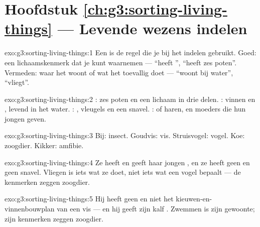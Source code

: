 \section*{Hoofdstuk \ref{ch:g3:sorting-living-things} --- Levende wezens indelen}

\begin{solution}{exo:g3:sorting-living-things:1}
Een  is de regel die je bij het indelen gebruikt. Goed: een
lichaamskenmerk dat je kunt waarnemen --- ``heeft '', ``heeft zes
poten''. Vermeden: waar het woont of wat het toevallig doet --- ``woont
bij water'', ``vliegt''.
\end{solution}

\begin{solution}{exo:g3:sorting-living-things:2}
: zes poten en een lichaam in drie delen. : vinnen en
, levend in het water. : , vleugels en een snavel.
:  of haren, en moeders die hun jongen  geven.
\end{solution}

\begin{solution}{exo:g3:sorting-living-things:3}
Bij: insect. Goudvis: vis. Struisvogel: vogel. Koe: zoogdier. Kikker:
amfibie.
\end{solution}

\begin{solution}{exo:g3:sorting-living-things:4}
Ze heeft  en geeft haar jongen , en ze heeft geen  en
geen snavel. Vliegen is iets wat ze doet, niet iets wat een vogel
bepaalt --- de kenmerken zeggen zoogdier.
\end{solution}

\begin{solution}{exo:g3:sorting-living-things:5}
Hij heeft geen  en niet het kieuwen-en-vinnenbouwplan van een
vis --- en hij geeft zijn kalf . Zwemmen is zijn gewoonte; zijn
kenmerken zeggen zoogdier.
\end{solution}

